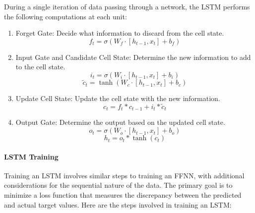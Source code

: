 \documentclass{article}
\begin{document}
    During a single iteration of data passing through a network, the LSTM performs the following computations at each unit:

    \begin{enumerate}[label={(\arabic*)}]
        \item {Forget Gate}: Decide what information to discard from the cell state.
        \[
        f_t = \sigma(W_f \cdot [h_{t-1}, x_t] + b_f)
        \]

        \item {Input Gate and Candidate Cell State}: Determine the new information to add to the cell state.
        \[
        i_t = \sigma(W_i \cdot [h_{t-1}, x_t] + b_i)
        \]
        \[
        \tilde{c}_t = \tanh(W_c \cdot [h_{t-1}, x_t] + b_c)
        \]

        \item {Update Cell State}: Update the cell state with the new information.
        \[
        c_t = f_t * c_{t-1} + i_t * \tilde{c}_t
        \]

        \item {Output Gate}: Determine the output based on the updated cell state.
        \[
        o_t = \sigma(W_o \cdot [h_{t-1}, x_t] + b_o)
        \]
        \[
        h_t = o_t * \tanh(c_t)
        \]
    \end{enumerate}

    \paragraph{LSTM Training}

    Training an LSTM involves similar steps to training an FFNN, with additional considerations for the sequential nature of the data. The primary goal is to minimize a loss function that measures the discrepancy between the predicted and actual target values. Here are the steps involved in training an LSTM:
    
\end{document}
